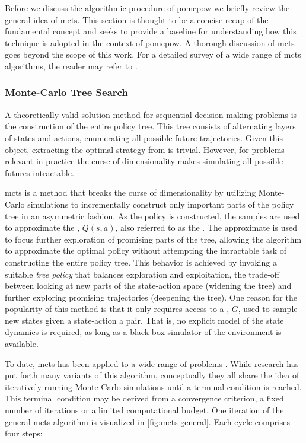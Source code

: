 Before we discuss the algorithmic procedure of \ac{pomcpow} we briefly review
the general idea of \ac{mcts}. This section is thought to be a concise recap of
the fundamental concept and seeks to provide a baseline for understanding how
this technique is adopted in the context of \ac{pomcpow}. A thorough discussion
of \ac{mcts} goes beyond the scope of this work. For a detailed survey of
a wide range of \ac{mcts} algorithms, the reader may refer to
\cite{browne2012survey}.

\subsubsection{Monte-Carlo Tree Search}

A theoretically valid solution method for sequential decision making problems
is the construction of the entire policy tree. This tree consists of alternating
layers of states and actions, enumerating all possible future trajectories.
Given this object, extracting the optimal strategy from is trivial. However,
for problems relevant in practice the curse of dimensionality makes simulating
all possible futures intractable.

\acf{mcts} is a method that breaks the curse of dimensionality by utilizing
Monte-Carlo simulations to incrementally construct only important parts of the
policy tree in an asymmetric fashion. As the policy is constructed, the samples
are used to approximate the , $Q(s, a)$,
also referred to as the \vname{\qfunction}. The approximate \qfunction is used
to focus further exploration of promising parts of the tree, allowing the
algorithm to approximate the optimal policy without attempting the intractable
task of constructing the entire policy tree. This behavior is achieved by
invoking a suitable \emph{tree policy} that balances exploration and
exploitation, the trade-off between looking at new parts of the state-action
space (widening the tree) and further exploring promising trajectories
(deepening the tree). One reason for the popularity of this method is that
it only requires access to a , $G$, used to sample new states
given a state-action a pair. That is, no explicit model of the state dynamics is
required, as long as a black box simulator of the environment is available.

To date, \ac{mcts} has been applied to a wide range of problems
\cite{browne2012survey}. While research has put forth many variants of this
algorithm, conceptually they all share the idea of iteratively running
Monte-Carlo simulations until a terminal condition is reached. This terminal
condition may be derived from a convergence criterion, a fixed number of
iterations or a limited computational budget. One iteration of the general
\ac{mcts} algorithm is visualized in \cref{fig:mcts-general}. Each cycle
comprises four steps:

